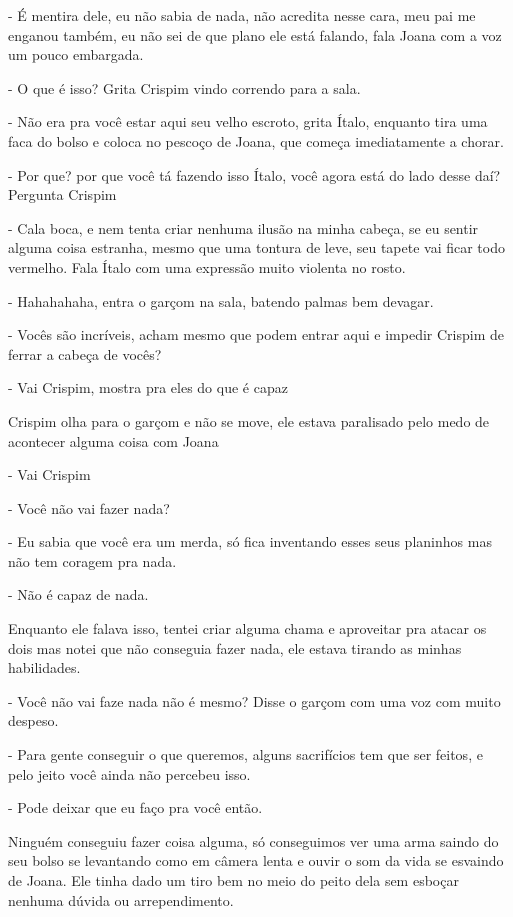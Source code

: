 - É mentira dele, eu não sabia de nada, não acredita nesse cara, meu pai me enganou também, eu não sei de que plano ele está falando, fala Joana com a voz um pouco embargada.

- O que é isso? Grita Crispim vindo correndo para a sala.

- Não era pra você estar aqui seu velho escroto, grita Ítalo, enquanto tira uma faca do bolso e coloca no pescoço de Joana, que começa imediatamente a chorar.

- Por que? por que você tá fazendo isso Ítalo, você agora está do lado desse daí? Pergunta Crispim

- Cala boca, e nem tenta criar nenhuma ilusão na minha cabeça, se eu sentir alguma coisa estranha, mesmo que uma tontura de leve, seu tapete vai ficar todo vermelho. Fala Ítalo com uma expressão muito violenta no rosto.

- Hahahahaha, entra o garçom na sala, batendo palmas bem devagar.

- Vocês são incríveis, acham mesmo que podem entrar aqui e impedir Crispim de ferrar a cabeça de vocês?

- Vai Crispim, mostra pra eles do que é capaz

Crispim olha para o garçom e não se move, ele estava paralisado pelo medo de acontecer alguma coisa com Joana

- Vai Crispim

- Você não vai fazer nada?

- Eu sabia que você era um merda, só fica inventando esses seus planinhos mas não tem coragem pra nada.

- Não é capaz de nada.

Enquanto ele falava isso, tentei criar alguma chama e aproveitar pra atacar os dois mas notei que não conseguia fazer nada, ele estava tirando as minhas habilidades. 

- Você não vai faze nada não é mesmo? Disse o garçom com uma voz com muito despeso.

- Para gente conseguir o que queremos, alguns sacrifícios tem que ser feitos, e pelo jeito você ainda não percebeu isso.

- Pode deixar que eu faço pra você então.

Ninguém conseguiu fazer coisa alguma, só conseguimos ver uma arma saindo do seu bolso se levantando como em câmera lenta e ouvir o som da vida se esvaindo de Joana. Ele tinha  dado um tiro bem no meio do peito dela sem esboçar nenhuma dúvida ou arrependimento.

